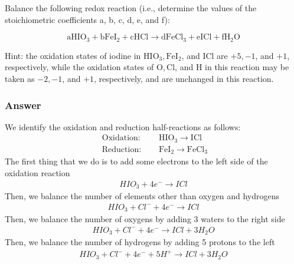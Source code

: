 \documentclass[12pt]{article}
\begin{document}
\section{}
Balance the following redox reaction (i.e., determine the values of the stoichiometric coefficients a, b, c, d, e, and f):

$$
\mathrm{aHIO}_{3}+\mathrm{bFeI}_{2}+\mathrm{cHCl} \rightarrow \mathrm{dFeCl}_{3}+\mathrm{eICl}+\mathrm{fH}_{2} \mathrm{O}
$$

Hint: the oxidation states of iodine in $\mathrm{HIO}_{3}, \mathrm{FeI}_{2}$, and $\mathrm{ICl}$ are $+5, -1$, and $+1$, respectively, while the oxidation states of $\mathrm{O}, \mathrm{Cl}$, and $\mathrm{H}$ in this reaction may be taken as $-2, -1$, and $+1$, respectively, and are unchanged in this reaction.
\subsubsection{Answer}
We identify the oxidation and reduction half-reactions as follows:
\begin{equation}
\begin{aligned}
\text { Oxidation: } & \quad \mathrm{HIO}_{3} \rightarrow \mathrm{ICl} \\
\text { Reduction: } & \quad \mathrm{FeI}_{2} \rightarrow \mathrm{FeCl}_{3}
\end{aligned}
\end{equation}
The first thing that we do is to add some electrons to the left side of the oxidation reaction
\begin{equation}
\begin{aligned}
HIO_{3}+4e^{-} \rightarrow ICl
\end{aligned}
\end{equation}
Then, we balance the number of elements other than oxygen and hydrogens
\begin{equation}
\begin{aligned}
HIO_{3}+Cl^{-} + 4e^{-} \rightarrow ICl
\end{aligned}
\end{equation}
Then, we balance the number of oxygens by adding 3 waters to the right side
\begin{equation}
\begin{aligned}
HIO_{3}+Cl^{-} + 4e^{-} \rightarrow ICl + 3H_{2}O
\end{aligned}
\end{equation}
Then, we balance the number of hydrogens by adding 5 protons to the left
\begin{equation}
\begin{aligned}
HIO_{3}+Cl^{-} + 4e^{-} + 5H^{+} \rightarrow ICl + 3H_{2}O
\end{aligned}
\end{equation}
\end{document}
